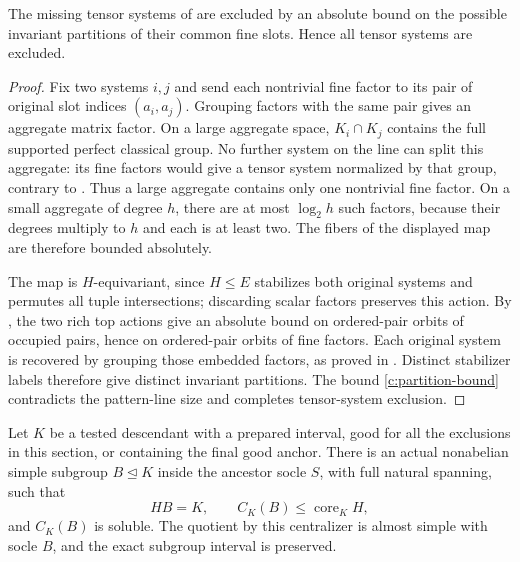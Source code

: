 \begin{proposition}\label{c:tensor-pruning}
The missing tensor systems of  are excluded by an absolute bound on the possible invariant partitions of their common fine slots. Hence all tensor systems are excluded.
\end{proposition}

\begin{proof}
Fix two systems $i,j$ and send each nontrivial fine factor to its pair
of original slot indices $(a_i,a_j)$. Grouping factors with the same
pair gives an aggregate matrix factor. On a large aggregate space,
$K_i\cap K_j$ contains the full supported perfect classical group.
No further system on the line can split this aggregate: its fine
factors would give a tensor system normalized by that group, contrary
to . Thus a large aggregate contains only one
nontrivial fine factor. On a small aggregate of degree $h$, there are
at most $\log_2h$ such factors, because their degrees multiply to $h$
and each is at least two. The fibers of the displayed map are therefore
bounded absolutely.

The map is $H$-equivariant, since $H\le E$ stabilizes both original
systems and permutes all tuple intersections; discarding scalar factors
preserves this action. By , the two rich top actions
give an absolute bound on ordered-pair orbits of occupied pairs, hence
on ordered-pair orbits of fine factors. Each original system is recovered
by grouping those embedded factors, as proved in
. Distinct stabilizer labels therefore give
distinct invariant partitions. The bound \eqref{c:partition-bound}
contradicts the pattern-line size and completes tensor-system exclusion.
\end{proof}

\begin{theorem}\label{c:classical-conclusion}
Let \(K\) be a tested descendant with a prepared interval, good for all the exclusions in this section, or containing the final good anchor. There is an actual nonabelian simple subgroup \(B\trianglelefteq K\) inside the ancestor socle \(S\), with full natural spanning, such that
\[
 HB=K,\qquad C_K(B)\le\operatorname{core}_K H,
\]
and \(C_K(B)\) is soluble. The quotient by this centralizer is almost simple with socle \(B\), and the exact subgroup interval is preserved.
\end{theorem}

